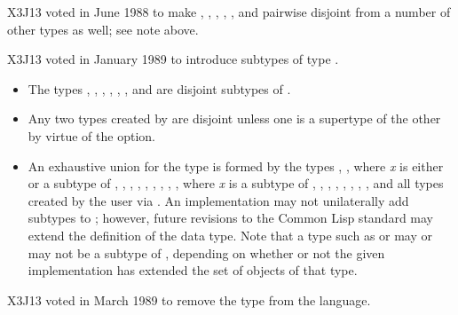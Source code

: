 \begin{new}
X3J13 voted in June 1988
to make , , , ,
, and 
pairwise disjoint from a number of other types as well;
see note above.
\end{new}

\begin{new}
X3J13 voted in January 1989
to introduce subtypes of type .

\begin{itemize}
\item
The types , ,
, , , , and
 are disjoint subtypes of .
\end{itemize}
\end{new}

\begin{itemize}
\item
Any two types created by  are disjoint unless
one is a supertype of the other by virtue of
the  option.
\end{itemize}

\begin{obsolete}
\begin{itemize}
\item
An exhaustive union for the type  is formed by the types
, ,  where {\it x} is either {\true} or 
a subtype
of , , , , ,
, , , ,
 where {\it x} is a
subtype of ,
, , , , ,
, , and all types created by the user
via .
An implementation may not unilaterally add subtypes to
; however, future revisions to the Common Lisp standard may
extend the definition of the  data type.
Note that a type such as  or  may or may
not be a subtype of , depending on whether or not the given
implementation has extended the set of objects of that type.
\end{itemize}
\end{obsolete}

\begin{newer}
X3J13 voted in March 1989
to remove the type  from the language.
\end{newer}
